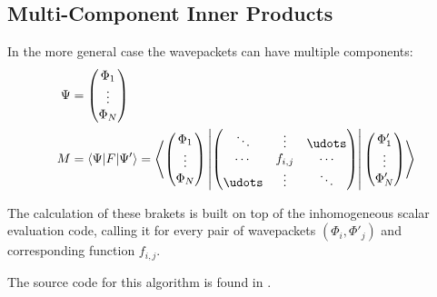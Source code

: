 \subsection{Multi-Component Inner Products}

In the more general case the wavepackets can have multiple components:
\begin{align}
  \Psi &= \begin{pmatrix} \Phi_1 \\ \vdots \\ \Phi_N \end{pmatrix} \\
  M &= \langle \Psi | F | \Psi' \rangle = \left\langle
    \begin{pmatrix} \Phi_1 \\ \vdots \\ \Phi_N \end{pmatrix} \left|
    \begin{pmatrix} \ddots & \vdots & \udots \\ \cdots & f_{i,j} & \cdots \\
      \udots & \vdots & \ddots \end{pmatrix} \right|
    \begin{pmatrix} \Phi'_1 \\ \vdots \\ \Phi'_N \end{pmatrix}
    \right\rangle
\end{align}

The calculation of these brakets is built on top of the inhomogeneous scalar
evaluation code, calling it for every pair of wavepackets $(\Phi_i,\Phi'_j)$ and
corresponding function $f_{i,j}$.

The source code for this algorithm is found in
.
